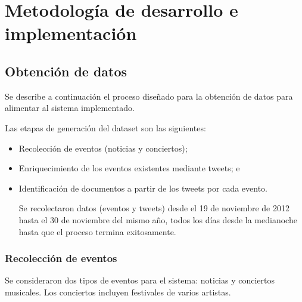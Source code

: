 \documentclass[upright, contnum]{umemoria}
\begin{document}
\section{Metodología de desarrollo e implementación}
\label{sec-1.2}

  

\subsection{Obtención de datos}
\label{sec-1.2.1}

    Se describe a continuación el proceso diseñado para la obtención de
    datos para alimentar al sistema implementado.

    Las etapas de generación del dataset son las siguientes:

\begin{itemize}
\item Recolección de eventos (noticias y conciertos);
\item Enriquecimiento de los eventos existentes mediante tweets; e
\item Identificación de documentos a partir de los tweets por cada evento.

      Se recolectaron datos (eventos y tweets) desde el 19 de noviembre de
      2012 hasta el 30 de noviembre del mismo año, todos los días
      desde la medianoche hasta que el proceso termina exitosamente.
\end{itemize}
\subsubsection{Recolección de eventos}

Se consideraron dos tipos de eventos para el sistema: noticias y
conciertos musicales. Los conciertos incluyen festivales de varios
artistas.
\end{document}
